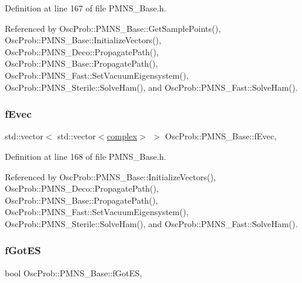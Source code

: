 Definition at line 167 of file P\+M\+N\+S\+\_\+\+Base.\+h.



Referenced by Osc\+Prob\+::\+P\+M\+N\+S\+\_\+\+Base\+::\+Get\+Sample\+Points(), Osc\+Prob\+::\+P\+M\+N\+S\+\_\+\+Base\+::\+Initialize\+Vectors(), Osc\+Prob\+::\+P\+M\+N\+S\+\_\+\+Deco\+::\+Propagate\+Path(), Osc\+Prob\+::\+P\+M\+N\+S\+\_\+\+Base\+::\+Propagate\+Path(), Osc\+Prob\+::\+P\+M\+N\+S\+\_\+\+Fast\+::\+Set\+Vacuum\+Eigensystem(), Osc\+Prob\+::\+P\+M\+N\+S\+\_\+\+Sterile\+::\+Solve\+Ham(), and Osc\+Prob\+::\+P\+M\+N\+S\+\_\+\+Fast\+::\+Solve\+Ham().

\mbox{\label{classOscProb_1_1PMNS__Base_a093e7bd31d4ef52ed52df414e12c1d17}} 
\subsubsection{\texorpdfstring{f\+Evec}{fEvec}}
{\footnotesize\ttfamily std\+::vector$<$ std\+::vector$<$\hyperlink{classOscProb_1_1PMNS__Base_ae86ec4718808ce9d02e5f5b4226714ab}{complex}$>$ $>$ Osc\+Prob\+::\+P\+M\+N\+S\+\_\+\+Base\+::f\+Evec\hspace{0.3cm}{\ttfamily [protected]}, {\ttfamily [inherited]}}



Definition at line 168 of file P\+M\+N\+S\+\_\+\+Base.\+h.



Referenced by Osc\+Prob\+::\+P\+M\+N\+S\+\_\+\+Base\+::\+Initialize\+Vectors(), Osc\+Prob\+::\+P\+M\+N\+S\+\_\+\+Deco\+::\+Propagate\+Path(), Osc\+Prob\+::\+P\+M\+N\+S\+\_\+\+Base\+::\+Propagate\+Path(), Osc\+Prob\+::\+P\+M\+N\+S\+\_\+\+Fast\+::\+Set\+Vacuum\+Eigensystem(), Osc\+Prob\+::\+P\+M\+N\+S\+\_\+\+Sterile\+::\+Solve\+Ham(), and Osc\+Prob\+::\+P\+M\+N\+S\+\_\+\+Fast\+::\+Solve\+Ham().

\mbox{\label{classOscProb_1_1PMNS__Base_a6dc5cd010d2d70b2324745b4e53e9839}} 
\subsubsection{\texorpdfstring{f\+Got\+ES}{fGotES}}
{\footnotesize\ttfamily bool Osc\+Prob\+::\+P\+M\+N\+S\+\_\+\+Base\+::f\+Got\+ES\hspace{0.3cm}{\ttfamily [protected]}, {\ttfamily [inherited]}}



